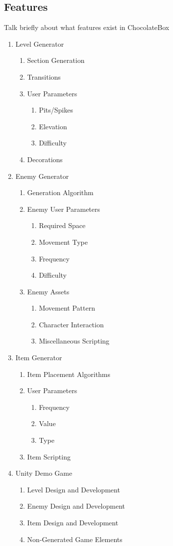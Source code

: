 \documentclass[pdftex,12pt,letter]{article}
\begin{document}
\subsection{Features}
Talk briefly about what features exist in ChocolateBox
\begin{enumerate}
\item Level Generator
\begin{enumerate}
\item Section Generation
\item Transitions
\item User Parameters
\begin{enumerate}
\item Pits/Spikes
\item Elevation
\item Difficulty
\end{enumerate}
\item Decorations
\end{enumerate}

\item Enemy Generator
\begin{enumerate}
\item Generation Algorithm
\item Enemy User Parameters
\begin{enumerate}
\item Required Space
\item Movement Type
\item Frequency
\item Difficulty
\end{enumerate}
\item Enemy Assets
\begin{enumerate}
\item Movement Pattern
\item Character Interaction
\item Miscellaneous Scripting
\end{enumerate}
\end{enumerate}

\item{Item Generator}
\begin{enumerate}
\item Item Placement Algorithms
\item User Parameters
\begin{enumerate}
\item Frequency
\item Value
\item Type
\end{enumerate}
\item Item Scripting
\end{enumerate}

\item{Unity Demo Game}
\begin{enumerate}
\item Level Design and Development
\item Enemy Design and Development
\item Item Design and Development
\item Non-Generated Game Elements
\end{enumerate}
\end{enumerate}
\end{document}
